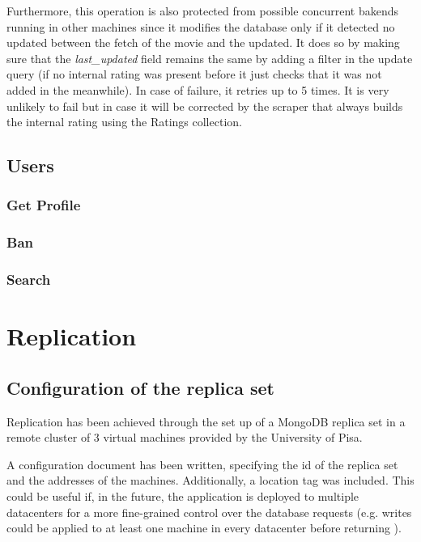\documentclass[11pt]{article}
\begin{document}
Furthermore, this operation is also protected from possible concurrent bakends running in other machines since it modifies the database only if it detected no updated between the fetch of the movie and the updated. It does so by making sure that the \emph{last\_updated} field remains the same by adding a filter in the update query (if no internal rating was present before it just checks that it was not added in the meanwhile). In case of failure, it retries up to 5 times. It is very unlikely to fail but in case it will be corrected by the scraper that always builds the internal rating using the Ratings collection.



\subsection{Users}
\subsubsection{Get Profile}

\subsubsection{Ban}

\subsubsection{Search}

\section{Replication}
\subsection{Configuration of the replica set}
Replication has been achieved through the set up of a MongoDB replica set in a remote cluster of 3 virtual machines provided by the University of Pisa.

A configuration document has been written, specifying the id of the replica set and the addresses of the machines. Additionally, a location tag was included. This could be useful if, in the future, the application is deployed to multiple datacenters for a more fine-grained control over the database requests (e.g. writes could be applied to at least one machine in every datacenter before returning ). 
\end{document}
